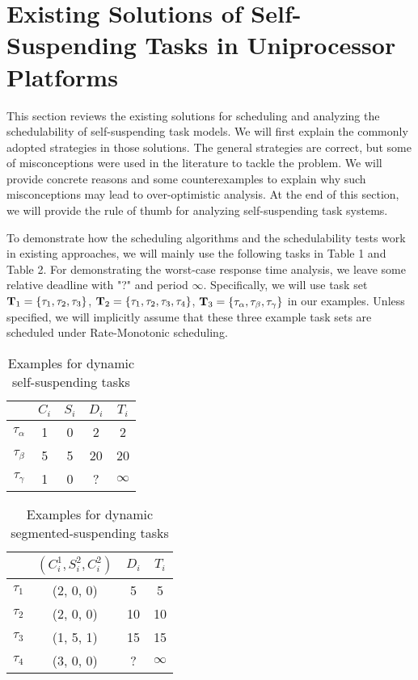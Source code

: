\section{Existing Solutions of Self-Suspending Tasks in Uniprocessor Platforms}

This section reviews the existing solutions for scheduling and analyzing the schedulability of self-suspending task models. We will first explain the commonly adopted strategies in those solutions. The general strategies are correct, but some of misconceptions were used in the literature to tackle the problem. We will provide concrete reasons and some counterexamples to explain why such misconceptions may lead to over-optimistic analysis. At the end of this section, we will provide the rule of thumb for analyzing self-suspending task systems. 

To demonstrate how the scheduling algorithms and the schedulability tests work in existing approaches, we will mainly use the following tasks in Table 1 and Table 2. For demonstrating the worst-case response time analysis, we leave some relative deadline with "?" and period $\infty$. Specifically, we will use task set ${\bf T}_1 = \left\{{\tau_1, \tau_2, \tau_3}\right\}$, ${\bf T}_2 = \left\{{\tau_1, \tau_2, \tau_3, \tau_4}\right\}$, ${\bf T}_3 = \left\{{\tau_\alpha, \tau_\beta, \tau_\gamma}\right\}$ in our examples. Unless specified, we will implicitly assume that these three example task sets are scheduled under Rate-Monotonic scheduling. 

\begin{table} 
    \begin{tabular}{|c|c|c|c|c|}
        & $C_i$ &  $S_i$&  $D_i$ & $T_i$\\ 
        \hline
        $\tau_\alpha$ & 1 & 0 &  2 & 2\\ 
        $\tau_\beta$ &  5&  5& 20 & 20 \\ 
        $\tau_\gamma$ & 1 & 0  & ? & $\infty$ \\ 
        \hline
    \end{tabular} 
    \caption{Examples for dynamic self-suspending tasks}
\end{table}

\begin{table} 
    \begin{tabular}{|c|c|c|c|}
        & $(C_i^1, S_i^2, C_i^2)$ &  $D_i$ & $T_i$\\ 
        \hline
        $\tau_1$ & (2, 0, 0) &  5 & 5\\ 
        $\tau_2$ &  (2, 0, 0) & 10 & 10 \\ 
        $\tau_3$ & (1, 5, 1) & 15  & 15\\
        $\tau_4$ & (3, 0, 0) & ? & $\infty$\\
        \hline
    \end{tabular} 
    \caption{Examples for dynamic segmented-suspending tasks}
\end{table}


